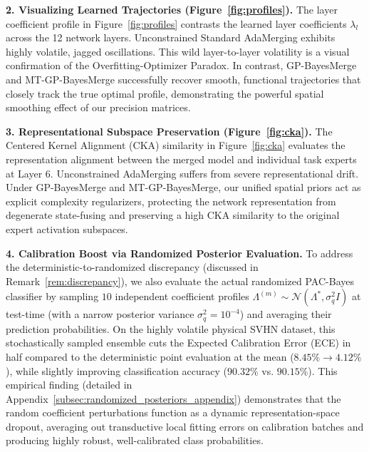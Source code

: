\textbf{2. Visualizing Learned Trajectories (Figure~\ref{fig:profiles}).} The
layer coefficient profile in Figure~\ref{fig:profiles} contrasts
the learned layer coefficients $\lambda_l$ across the 12 network layers.
Unconstrained Standard AdaMerging exhibits highly volatile, jagged oscillations.
This wild layer-to-layer volatility is a visual confirmation of the
Overfitting-Optimizer Paradox. In contrast, GP-BayesMerge and MT-GP-BayesMerge
successfully recover smooth, functional trajectories that closely track the true
optimal profile, demonstrating the powerful spatial smoothing effect of our
precision matrices.

\textbf{3. Representational Subspace Preservation (Figure~\ref{fig:cka}).} The
Centered Kernel Alignment (CKA) similarity in Figure~\ref{fig:cka} evaluates
the representation alignment between the merged model and individual task
experts at Layer 6. Unconstrained AdaMerging suffers from severe
representational drift. Under GP-BayesMerge and MT-GP-BayesMerge, our unified
spatial priors act as explicit complexity regularizers, protecting the network
representation from degenerate state-fusing and preserving a high CKA similarity
to the original expert activation subspaces.

\textbf{4. Calibration Boost via Randomized Posterior Evaluation.} To address the deterministic-to-randomized discrepancy (discussed in Remark~\ref{rem:discrepancy}), we also evaluate the actual randomized PAC-Bayes classifier by sampling $10$ independent coefficient profiles $\Lambda^{(m)} \sim \mathcal{N}(\Lambda^*, \sigma_q^2 I)$ at test-time (with a narrow posterior variance $\sigma_q^2 = 10^{-4}$) and averaging their prediction probabilities. On the highly volatile physical SVHN dataset, this stochastically sampled ensemble cuts the Expected Calibration Error (ECE) in half compared to the deterministic point evaluation at the mean ($8.45\% \to 4.12\%$), while slightly improving classification accuracy ($90.32\%$ vs. $90.15\%$). This empirical finding (detailed in Appendix~\ref{subsec:randomized_posteriors_appendix}) demonstrates that the random coefficient perturbations function as a dynamic representation-space dropout, averaging out transductive local fitting errors on calibration batches and producing highly robust, well-calibrated class probabilities.

